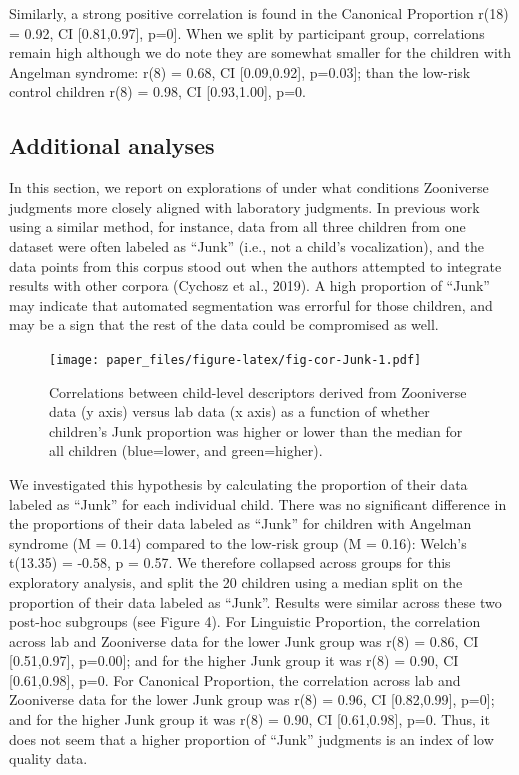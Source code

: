 \documentclass[english,,man,floatsintext]{apa6}
\begin{document}
Similarly, a strong positive correlation is found in the Canonical Proportion r(18) = 0.92, CI {[}0.81,0.97{]}, p=0{]}. When we split by participant group, correlations remain high although we do note they are somewhat smaller for the children with Angelman syndrome: r(8) = 0.68, CI {[}0.09,0.92{]}, p=0.03{]}; than the low-risk control children r(8) = 0.98, CI {[}0.93,1.00{]}, p=0.

\hypertarget{additional-analyses}{%
\subsection{Additional analyses}\label{additional-analyses}}

In this section, we report on explorations of under what conditions Zooniverse judgments more closely aligned with laboratory judgments. In previous work using a similar method, for instance, data from all three children from one dataset were often labeled as \enquote{Junk} (i.e., not a child's vocalization), and the data points from this corpus stood out when the authors attempted to integrate results with other corpora (Cychosz et al., 2019). A high proportion of \enquote{Junk} may indicate that automated segmentation was errorful for those children, and may be a sign that the rest of the data could be compromised as well.

\begin{figure}
\centering
\texttt{[image: paper\_files/figure-latex/fig-cor-Junk-1.pdf]}
\caption{\label{fig:fig-cor-Junk}Correlations between child-level descriptors derived from Zooniverse data (y axis) versus lab data (x axis) as a function of whether children's Junk proportion was higher or lower than the median for all children (blue=lower, and green=higher).}
\end{figure}

We investigated this hypothesis by calculating the proportion of their data labeled as \enquote{Junk} for each individual child. There was no significant difference in the proportions of their data labeled as \enquote{Junk} for children with Angelman syndrome (M = 0.14) compared to the low-risk group (M = 0.16): Welch's t(13.35) = -0.58, p = 0.57. We therefore collapsed across groups for this exploratory analysis, and split the 20 children using a median split on the proportion of their data labeled as \enquote{Junk}. Results were similar across these two post-hoc subgroups (see Figure 4). For Linguistic Proportion, the correlation across lab and Zooniverse data for the lower Junk group was r(8) = 0.86, CI {[}0.51,0.97{]}, p=0.00{]}; and for the higher Junk group it was r(8) = 0.90, CI {[}0.61,0.98{]}, p=0. For Canonical Proportion, the correlation across lab and Zooniverse data for the lower Junk group was r(8) = 0.96, CI {[}0.82,0.99{]}, p=0{]}; and for the higher Junk group it was r(8) = 0.90, CI {[}0.61,0.98{]}, p=0. Thus, it does not seem that a higher proportion of \enquote{Junk} judgments is an index of low quality data.
\end{document}
